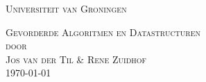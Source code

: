 \begin{titlepage}

\begin{center}

\Large
\textsc{Universiteit van Groningen}\\

\vspace{5cm}

\textsc{Gevorderde Algoritmen en Datastructuren\\[0.5\baselineskip]
door\\[0.5\baselineskip]
Jos van der Til \& Rene Zuidhof}\\

\vspace{5cm}
\textsc{\today}\\ %

\vspace{1cm}
\end{center}

\end{titlepage}